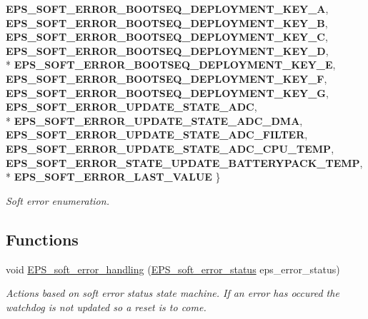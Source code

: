 \begin{DoxyCompactItemize}
{\bfseries E\-P\-S\-\_\-\-S\-O\-F\-T\-\_\-\-E\-R\-R\-O\-R\-\_\-\-B\-O\-O\-T\-S\-E\-Q\-\_\-\-D\-E\-P\-L\-O\-Y\-M\-E\-N\-T\-\_\-\-K\-E\-Y\-\_\-\-A}, 
{\bfseries E\-P\-S\-\_\-\-S\-O\-F\-T\-\_\-\-E\-R\-R\-O\-R\-\_\-\-B\-O\-O\-T\-S\-E\-Q\-\_\-\-D\-E\-P\-L\-O\-Y\-M\-E\-N\-T\-\_\-\-K\-E\-Y\-\_\-\-B}, 
{\bfseries E\-P\-S\-\_\-\-S\-O\-F\-T\-\_\-\-E\-R\-R\-O\-R\-\_\-\-B\-O\-O\-T\-S\-E\-Q\-\_\-\-D\-E\-P\-L\-O\-Y\-M\-E\-N\-T\-\_\-\-K\-E\-Y\-\_\-\-C}, 
{\bfseries E\-P\-S\-\_\-\-S\-O\-F\-T\-\_\-\-E\-R\-R\-O\-R\-\_\-\-B\-O\-O\-T\-S\-E\-Q\-\_\-\-D\-E\-P\-L\-O\-Y\-M\-E\-N\-T\-\_\-\-K\-E\-Y\-\_\-\-D}, 
\\*
{\bfseries E\-P\-S\-\_\-\-S\-O\-F\-T\-\_\-\-E\-R\-R\-O\-R\-\_\-\-B\-O\-O\-T\-S\-E\-Q\-\_\-\-D\-E\-P\-L\-O\-Y\-M\-E\-N\-T\-\_\-\-K\-E\-Y\-\_\-\-E}, 
{\bfseries E\-P\-S\-\_\-\-S\-O\-F\-T\-\_\-\-E\-R\-R\-O\-R\-\_\-\-B\-O\-O\-T\-S\-E\-Q\-\_\-\-D\-E\-P\-L\-O\-Y\-M\-E\-N\-T\-\_\-\-K\-E\-Y\-\_\-\-F}, 
{\bfseries E\-P\-S\-\_\-\-S\-O\-F\-T\-\_\-\-E\-R\-R\-O\-R\-\_\-\-B\-O\-O\-T\-S\-E\-Q\-\_\-\-D\-E\-P\-L\-O\-Y\-M\-E\-N\-T\-\_\-\-K\-E\-Y\-\_\-\-G}, 
{\bfseries E\-P\-S\-\_\-\-S\-O\-F\-T\-\_\-\-E\-R\-R\-O\-R\-\_\-\-U\-P\-D\-A\-T\-E\-\_\-\-S\-T\-A\-T\-E\-\_\-\-A\-D\-C}, 
\\*
{\bfseries E\-P\-S\-\_\-\-S\-O\-F\-T\-\_\-\-E\-R\-R\-O\-R\-\_\-\-U\-P\-D\-A\-T\-E\-\_\-\-S\-T\-A\-T\-E\-\_\-\-A\-D\-C\-\_\-\-D\-M\-A}, 
{\bfseries E\-P\-S\-\_\-\-S\-O\-F\-T\-\_\-\-E\-R\-R\-O\-R\-\_\-\-U\-P\-D\-A\-T\-E\-\_\-\-S\-T\-A\-T\-E\-\_\-\-A\-D\-C\-\_\-\-F\-I\-L\-T\-E\-R}, 
{\bfseries E\-P\-S\-\_\-\-S\-O\-F\-T\-\_\-\-E\-R\-R\-O\-R\-\_\-\-U\-P\-D\-A\-T\-E\-\_\-\-S\-T\-A\-T\-E\-\_\-\-A\-D\-C\-\_\-\-C\-P\-U\-\_\-\-T\-E\-M\-P}, 
{\bfseries E\-P\-S\-\_\-\-S\-O\-F\-T\-\_\-\-E\-R\-R\-O\-R\-\_\-\-S\-T\-A\-T\-E\-\_\-\-U\-P\-D\-A\-T\-E\-\_\-\-B\-A\-T\-T\-E\-R\-Y\-P\-A\-C\-K\-\_\-\-T\-E\-M\-P}, 
\\*
{\bfseries E\-P\-S\-\_\-\-S\-O\-F\-T\-\_\-\-E\-R\-R\-O\-R\-\_\-\-L\-A\-S\-T\-\_\-\-V\-A\-L\-U\-E}
 \}
\begin{DoxyCompactList}\small\item\em Soft error enumeration. \end{DoxyCompactList}\end{DoxyCompactItemize}
\subsection*{Functions}
\begin{DoxyCompactItemize}
\item 
void \hyperlink{group__softerror_gab10565fb179c0dfa254a931c0d01e029}{E\-P\-S\-\_\-soft\-\_\-error\-\_\-handling} (\hyperlink{group__softerror_ga82875cd4cc1b94ab7e638961c1b79e08}{E\-P\-S\-\_\-soft\-\_\-error\-\_\-status} eps\-\_\-error\-\_\-status)
\begin{DoxyCompactList}\small\item\em Actions based on soft error status state machine. If an error has occured the watchdog is not updated so a reset is to come. \end{DoxyCompactList}\end{DoxyCompactItemize}
